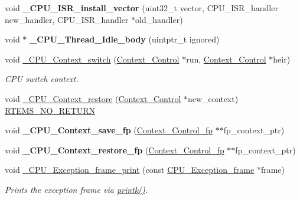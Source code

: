 \begin{DoxyCompactItemize}
void {\bfseries \+\_\+\+C\+P\+U\+\_\+\+I\+S\+R\+\_\+install\+\_\+vector} (uint32\+\_\+t vector, C\+P\+U\+\_\+\+I\+S\+R\+\_\+handler new\+\_\+handler, C\+P\+U\+\_\+\+I\+S\+R\+\_\+handler $\ast$old\+\_\+handler)
\item 
\mbox{\label{group__RTEMSScoreCPUi386_ga903a802003c95d6ef5206cb330424a1b}} 
void $\ast$ {\bfseries \+\_\+\+C\+P\+U\+\_\+\+Thread\+\_\+\+Idle\+\_\+body} (uintptr\+\_\+t ignored)
\item 
void \mbox{\hyperlink{group__RTEMSScoreCPUi386_gaa9f8cc989454b28232e5375e30c90970}{\+\_\+\+C\+P\+U\+\_\+\+Context\+\_\+switch}} (\mbox{\hyperlink{structContext__Control}{Context\+\_\+\+Control}} $\ast$run, \mbox{\hyperlink{structContext__Control}{Context\+\_\+\+Control}} $\ast$heir)
\begin{DoxyCompactList}\small\item\em C\+PU switch context. \end{DoxyCompactList}\item 
void \mbox{\hyperlink{group__RTEMSScoreCPUi386_ga80726ebfe00f31a88b086cc4474c472f}{\+\_\+\+C\+P\+U\+\_\+\+Context\+\_\+restore}} (\mbox{\hyperlink{structContext__Control}{Context\+\_\+\+Control}} $\ast$new\+\_\+context) \mbox{\hyperlink{group__RTEMSScoreBaseDefs_gaa2f0ed67aa174f684bb31b7e8bdb386f}{R\+T\+E\+M\+S\+\_\+\+N\+O\+\_\+\+R\+E\+T\+U\+RN}}
\item 
\mbox{\label{group__RTEMSScoreCPUi386_ga14068cf644755c5f95495fc937e4c5d9}} 
void {\bfseries \+\_\+\+C\+P\+U\+\_\+\+Context\+\_\+save\+\_\+fp} (\mbox{\hyperlink{structContext__Control__fp}{Context\+\_\+\+Control\+\_\+fp}} $\ast$$\ast$fp\+\_\+context\+\_\+ptr)
\item 
\mbox{\label{group__RTEMSScoreCPUi386_ga57b3171c5692c9a1db94c2ad941ee22d}} 
void {\bfseries \+\_\+\+C\+P\+U\+\_\+\+Context\+\_\+restore\+\_\+fp} (\mbox{\hyperlink{structContext__Control__fp}{Context\+\_\+\+Control\+\_\+fp}} $\ast$$\ast$fp\+\_\+context\+\_\+ptr)
\item 
void \mbox{\hyperlink{group__RTEMSScoreCPUi386_gaa34a35de496258577c1454ba1ee07ce0}{\+\_\+\+C\+P\+U\+\_\+\+Exception\+\_\+frame\+\_\+print}} (const \mbox{\hyperlink{structCPU__Exception__frame}{C\+P\+U\+\_\+\+Exception\+\_\+frame}} $\ast$frame)
\begin{DoxyCompactList}\small\item\em Prints the exception frame via \mbox{\hyperlink{bspIo_8h_a380cfecc8035cec8a13b68c0cb90f32f}{printk()}}. \end{DoxyCompactList}\item 

\end{DoxyCompactItemize}

